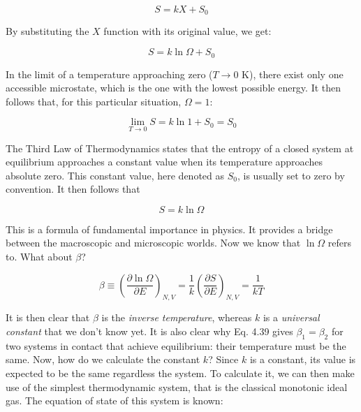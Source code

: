\documentclass[12pt,a4paper]{report}
\newcommand{\esp}{\vspace{0.5cm}}
\begin{document}
	\esp
	
	\begin{equation}
		S = kX + S_0
	\end{equation}
	
	\esp
	
	\noindent By substituting the $X$ function with its original value, we get:
	
	\esp
	
	\begin{equation}
		S = k \ln \Omega + S_0
	\end{equation}
	
	\esp
	
	In the limit of a temperature approaching zero ($T \to 0$ K), there exist only one accessible microstate, which is the one with the lowest possible energy. It then follows that, for this particular situation, $\Omega = 1$:
	
	\esp
	
	\begin{equation}
		\lim_{T \to 0} S = k \ln 1 + S_0 = S_0
	\end{equation}
	
	\esp
	
	\noindent The Third Law of Thermodynamics states that the entropy of a closed system at equilibrium approaches a constant value when its temperature approaches absolute zero. This constant value, here denoted as $S_0$, is usually set to zero by convention. It then follows that
	
	\esp
	
	\begin{equation}
		S = k \ln \Omega
	\end{equation}
	
	\esp
	
	\noindent This is a formula of fundamental importance in physics. It provides a bridge between the macroscopic and microscopic worlds. Now we know that $\ln \Omega$ refers to. What about $\beta$?
	
	\esp
	
	\begin{equation}
		\beta \equiv \left( \frac{\partial \ln \Omega}{\partial E} \right)_{N,V} = \frac{1}{k} \left( \frac{\partial S}{\partial E} \right)_{N,V} = \frac{1}{kT}
	\end{equation}
	
	\esp
	
	\noindent It is then clear that $\beta$ is the \textit{inverse temperature}, whereas $k$ is a \textit{universal constant} that we don't know yet. It is also clear why Eq. 4.39 gives $\beta_1 = \beta_2$ for two systems in contact that achieve equilibrium: their temperature must be the same. Now, how do we calculate the constant $k$? Since $k$ is a constant, its value is expected to be the same regardless the system. To calculate it, we can then make use of the simplest thermodynamic system, that is the classical monotonic ideal gas. The equation of state of this system is known:
	
\end{document}
